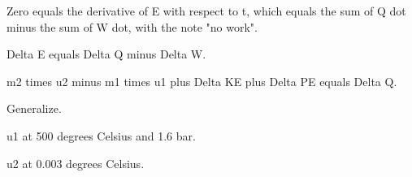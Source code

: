 Zero equals the derivative of E with respect to t, which equals the sum of Q dot minus the sum of W dot, with the note "no work".

Delta E equals Delta Q minus Delta W.

m2 times u2 minus m1 times u1 plus Delta KE plus Delta PE equals Delta Q.

Generalize.

u1 at 500 degrees Celsius and 1.6 bar.

u2 at 0.003 degrees Celsius.